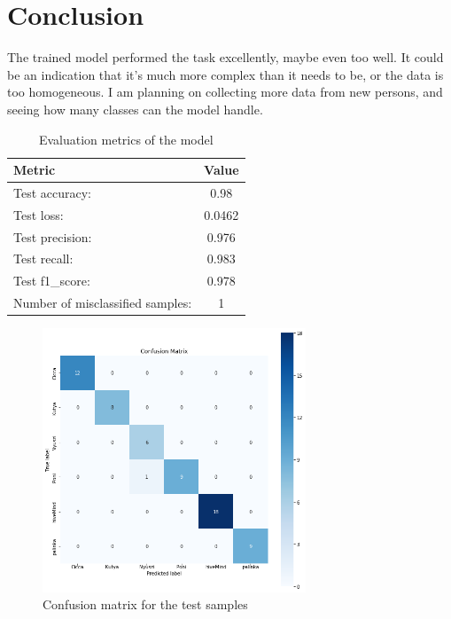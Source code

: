 \documentclass{article}
\begin{document}
\section{Conclusion}

The trained model performed the task excellently, maybe even too well. It could be an indication that it's much more complex than it needs to be, or the data is too homogeneous. I am planning on collecting more data from new persons, and seeing how many classes can the model handle.

\begin{table}[!h]
  \caption{Evaluation metrics of the model}
  \label{tab:eval_results}
  \centering
  \begin{tabular}{lc}
    \toprule
    Metric & Value \\
    \midrule
    Test accuracy:  & 0.98 \\
    Test loss:      & 0.0462 \\
    Test precision: & 0.976 \\
    Test recall:    & 0.983 \\
    Test f1\_score:  & 0.978 \\
    Number of misclassified samples: & 1 \\
    \bottomrule
  \end{tabular}
\end{table}

\begin{figure}[!h]
  \centering
  \includegraphics[width=0.7\textwidth]{img/conf_matrix}
  \caption{Confusion matrix for the test samples}
  \label{fig:conf_matrix}
\end{figure}
\end{document}

